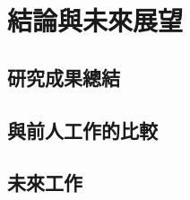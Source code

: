 \chapter{結論與未來展望}
\label{c:conclusion}

\section{研究成果總結}
\label{sec:summary}


\section{與前人工作的比較}
\label{sec:comparison}


\section{未來工作}
\label{sec:future_work}

